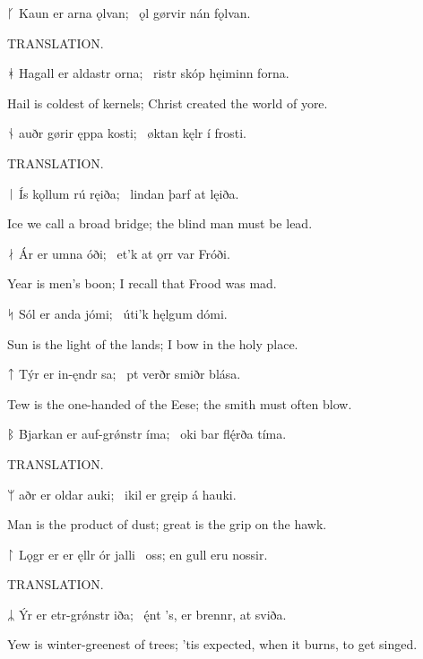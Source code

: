 \bvg\bva%
ᚴ Kaun er arna ǫlvan; \hld\ ǫl gørvir nán fǫlvan.\eva

\bvb TRANSLATION.\evb\evg


\bvg\bva%
ᚼ Hagall er aldastr orna; \hld\ ristr skóp hęiminn forna.\eva

\bvb Hail is coldest of kernels; Christ created the world of yore.\evb\evg


\bvg\bva%
ᚾ auðr gørir ęppa kosti; \hld\ øktan kęlr í frosti.\eva

\bvb TRANSLATION.\evb\evg


\bvg\bva%
ᛁ Ís kǫllum rú ręiða; \hld\ lindan þarf at lęiða.\eva

\bvb Ice we call a broad bridge; the blind man must be lead.\evb\evg


\bvg\bva%
ᛅ Ár er umna óði; \hld\ et’k at ǫrr var Fróði.\eva

\bvb Year is men’s boon; I recall that Frood was mad.\evb\evg


\bvg\bva%
ᛋ Sól er anda jómi; \hld\ úti’k hęlgum dómi.\eva

\bvb Sun is the light of the lands; I bow in the holy place.\evb\evg


\bvg\bva%
ᛏ Týr er in-ęndr sa; \hld\ pt verðr smiðr blása.\eva

\bvb Tew is the one-handed of the Eese; the smith must often blow.\evb\evg


\bvg\bva%
ᛒ Bjarkan er auf-grǿnstr íma; \hld\ oki bar flę́rða tíma.\eva

\bvb TRANSLATION.\evb\evg


\bvg\bva%
ᛘ aðr er oldar auki; \hld\ ikil er gręip á hauki.\eva

\bvb Man is the product of dust; great is the grip on the hawk.\evb\evg


\bvg\bva%
ᛚ Lǫgr er er ęllr ór jalli \hld\ oss; en gull eru nossir.\eva

\bvb TRANSLATION.\evb\evg


\bvg\bva%
ᛦ Ýr er etr-grǿnstr iða; \hld\ ę́nt ’s, er brennr, at sviða. \eva

\bvb Yew is winter-greenest of trees; ’tis expected, when it burns, to get singed.\evb\evg

\sectionline

